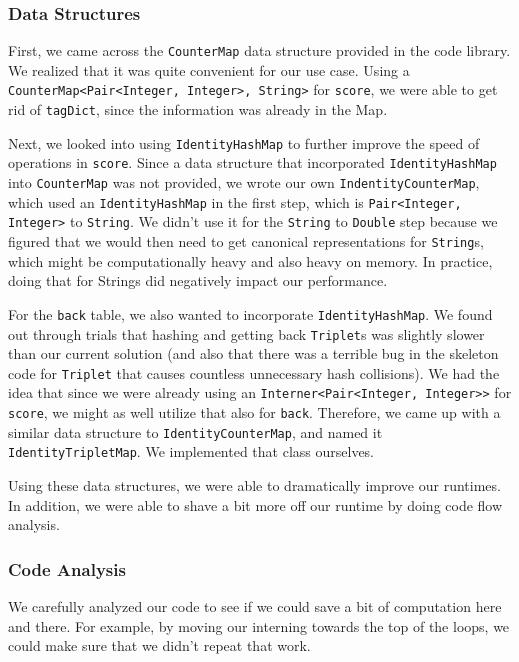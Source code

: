 \documentclass[12pt]{article}
\begin{document}
\subsubsection{Data Structures}
First, we came across the \texttt{CounterMap} data structure provided in the code library. We realized that it was quite convenient for our use case. Using a \texttt{CounterMap<Pair<Integer, Integer>, String>} for \texttt{score}, we were able to get rid of \texttt{tagDict}, since the information was already in the Map.

Next, we looked into using \texttt{IdentityHashMap} to further improve the speed of operations in \texttt{score}. Since a data structure that incorporated \texttt{IdentityHashMap} into \texttt{CounterMap} was not provided, we wrote our own \texttt{IndentityCounterMap}, which used an \texttt{IdentityHashMap} in the first step, which is \texttt{Pair<Integer, Integer>} to \texttt{String}. We didn't use it for the \texttt{String} to \texttt{Double} step because we figured that we would then need to get canonical representations for \texttt{String}s, which might be computationally heavy and also heavy on memory. In practice, doing that for Strings did negatively impact our performance.

For the \texttt{back} table, we also wanted to incorporate \texttt{IdentityHashMap}. We found out through trials that hashing and getting back \texttt{Triplet}s was slightly slower than our current solution (and also that there was a terrible bug in the skeleton code for \texttt{Triplet} that causes countless unnecessary hash collisions). We had the idea that since we were already using an \texttt{Interner<Pair<Integer, Integer>>} for \texttt{score}, we might as well utilize that also for \texttt{back}. Therefore, we came up with a similar data structure to \texttt{IdentityCounterMap}, and named it \texttt{IdentityTripletMap}. We implemented that class ourselves.

Using these data structures, we were able to dramatically improve our runtimes. In addition, we were able to shave a bit more off our runtime by doing code flow analysis.
\subsubsection{Code Analysis}
We carefully analyzed our code to see if we could save a bit of computation here and there. For example, by moving our interning towards the top of the loops, we could make sure that we didn't repeat that work.
\end{document}
